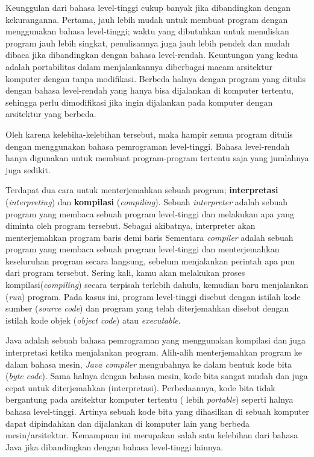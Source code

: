 Keunggulan dari bahasa  level-tinggi cukup banyak jika dibandingkan dengan kekuranganna. Pertama, jauh lebih mudah untuk membuat program dengan menggunakan bahasa level-tinggi; waktu yang dibutuhkan untuk menuliskan program jauh lebih singkat, penulisannya juga jauh lebih pendek dan mudah dibaca jika dibandingkan dengan bahasa level-rendah. Keuntungan yang kedua adalah portabilitas dalam menjalankannya diberbagai macam arsitektur komputer dengan tanpa modifikasi. Berbeda halnya dengan program yang ditulis dengan bahasa level-rendah yang hanya bisa dijalankan di komputer tertentu, sehingga perlu dimodifikasi jika ingin dijalankan pada komputer dengan arsitektur yang berbeda.

Oleh karena kelebiha-kelebihan tersebut, maka hampir semua program ditulis dengan menggunakan bahasa pemrograman level-tinggi. Bahasa level-rendah hanya digunakan untuk membuat program-program tertentu saja yang jumlahnya juga sedikit.

Terdapat dua cara untuk menterjemahkan sebuah program; \textbf{interpretasi} (\textit{interpreting}) dan \textbf{kompilasi} (\textit{compiling}). Sebuah \textit{interpreter} adalah sebuah program yang membaca sebuah program level-tinggi dan melakukan apa yang diminta oleh program tersebut. Sebagai akibatnya, interpreter akan menterjemahkan program baris demi baris
Sementara \textit{compiler} adalah sebuah program yang membaca sebuah program level-tinggi dan menterjemahkan keseluruhan program secara langsung, sebelum menjalankan perintah apa pun dari program tersebut. Sering kali, kamu akan melakukan proses kompilasi(\textit{compiling}) secara terpisah terlebih dahulu, kemudian baru  menjalankan (\textit{run}) program. Pada kasus ini, program level-tinggi disebut dengan istilah kode sumber (\textit{source code}) dan program yang telah diterjemahkan disebut dengan istilah kode objek (\textit{object code}) atau \textit{executable}.

Java adalah sebuah bahasa pemrograman yang menggunakan kompilasi dan juga interpretasi ketika menjalankan program. Alih-alih menterjemahkan program ke dalam bahasa mesin, \textit{Java compiler} mengubahnya ke dalam bentuk kode bita (\textit{byte code}). Sama halnya dengan bahasa mesin, kode bita sangat mudah dan juga cepat untuk diterjemahkan (interpretasi). Perbedaannya, kode bita tidak bergantung pada arsitektur komputer tertentu ( lebih \textit{portable}) seperti halnya bahasa level-tinggi. Artinya sebuah kode bita yang dihasilkan di sebuah komputer dapat dipindahkan dan dijalankan di komputer lain yang berbeda mesin/arsitektur. Kemampuan ini merupakan salah satu kelebihan dari bahasa Java jika dibandingkan dengan bahasa level-tinggi lainnya.

